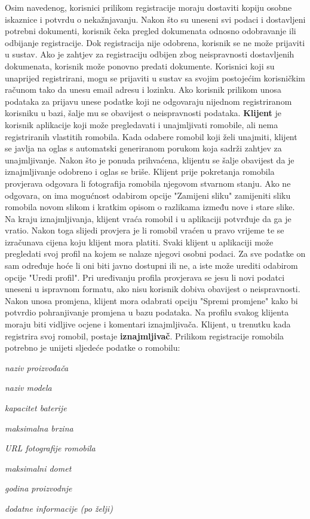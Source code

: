 		Osim navedenog, korisnici prilikom registracije moraju dostaviti kopiju osobne iskaznice i potvrdu o nekažnjavanju. Nakon što su uneseni svi podaci i dostavljeni potrebni dokumenti, korisnik čeka pregled dokumenata odnosno odobravanje ili odbijanje registracije. Dok registracija nije odobrena, korisnik se ne može prijaviti u sustav. Ako je zahtjev za registraciju odbijen zbog neispravnosti dostavljenih dokumenata, korisnik može ponovno predati dokumente. Korisnici koji su unaprijed registrirani, mogu se prijaviti u sustav sa svojim postojećim korisničkim računom tako da unesu email adresu i lozinku. Ako korisnik prilikom unosa podataka za prijavu unese podatke koji ne odgovaraju nijednom registriranom korisniku u bazi, šalje mu se obavijest o neispravnosti podataka. \textbf{Klijent} je korisnik aplikacije koji može pregledavati i unajmljivati romobile, ali nema registriranih vlastitih romobila. Kada odabere romobil koji želi unajmiti, klijent se javlja na oglas s automatski generiranom porukom koja sadrži zahtjev za unajmljivanje. Nakon što je ponuda prihvaćena, klijentu se šalje obavijest da je iznajmljivanje odobreno i oglas se briše. Klijent prije pokretanja romobila provjerava odgovara li fotografija romobila njegovom stvarnom stanju. Ako ne odgovara, on ima mogućnost odabirom opcije "Zamijeni sliku" zamijeniti sliku romobila novom slikom i kratkim opisom o razlikama između nove i stare slike. Na kraju iznajmljivanja, klijent vraća romobil i u aplikaciji potvrđuje da ga je vratio. Nakon toga slijedi provjera je li romobil vraćen u pravo vrijeme te se izračunava cijena koju klijent mora platiti. Svaki klijent u aplikaciji može pregledati svoj profil na kojem se nalaze njegovi osobni podaci. Za sve podatke on sam određuje hoće li oni biti javno dostupni ili ne, a iste može urediti odabirom opcije "Uredi profil".  Pri uređivanju profila provjerava se jesu li novi podatci uneseni u ispravnom formatu, ako nisu korisnik dobiva obavijest o neispravnosti. Nakon unosa promjena, klijent mora odabrati opciju "Spremi promjene" kako bi potvrdio pohranjivanje promjena u bazu podataka. Na profilu svakog klijenta moraju biti vidljive ocjene i komentari iznajmljivača. Klijent, u trenutku kada registrira svoj romobil, postaje \textbf{iznajmljivač}. Prilikom registracije romobila potrebno je unijeti sljedeće podatke o romobilu: 
		
			\begin{packed_item}
			\item \textit{naziv proizvođača}
			\item \textit{naziv modela}
			\item \textit{kapacitet baterije}
			\item \textit{maksimalna brzina}
			\item \textit{URL fotografije romobila}
			\item \textit{maksimalni domet}
			\item \textit{godina proizvodnje}
			\item \textit{dodatne informacije (po želji)}
			\end{packed_item}
			

